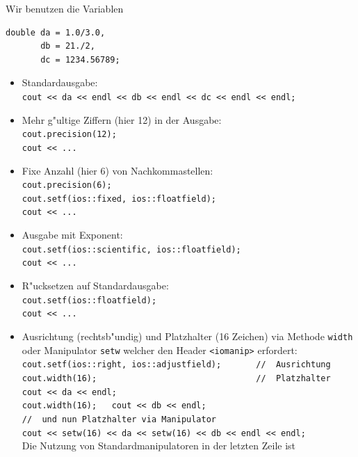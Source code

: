 Wir benutzen die Variablen 
%
\hspace{2cm}
\begin{minipage}[t]{0.4\textwidth}
\begin{verbatim}
double da = 1.0/3.0,
       db = 21./2,
       dc = 1234.56789;
\end{verbatim}
\end{minipage}
%
\begin{itemize}
%
 \item Standardausgabe: \\
 	\verb|cout << da << endl << db << endl << dc << endl << endl;|
%
 \item Mehr g"ultige Ziffern (hier 12) in der Ausgabe:\\
 	\verb|cout.precision(12);| \\
	\verb|cout << ...|
%
 \item Fixe Anzahl (hier 6) von Nachkommastellen: \\
 	\verb|cout.precision(6);|  \\
 	\verb|cout.setf(ios::fixed, ios::floatfield);|  \\
	\verb|cout << ...|
%
 \item Ausgabe mit Exponent:\\
 	\verb|cout.setf(ios::scientific, ios::floatfield);|  \\
	\verb|cout << ...|
%
 \item R"ucksetzen auf Standardausgabe:\\
 	\verb|cout.setf(ios::floatfield);|  \\
	\verb|cout << ...|
%
 \item Ausrichtung (rechtsb"undig) und Platzhalter (16 Zeichen) via Methode \texttt{width}
       oder Manipulator \texttt{setw} welcher den Header
       \verb|<iomanip>| erfordert:\\
 	\verb|cout.setf(ios::right, ios::adjustfield);       //  Ausrichtung| \\
 	\verb|cout.width(16);                                //  Platzhalter|  \\
	\verb|cout << da << endl;| \\
 	\verb|cout.width(16);   cout << db << endl;| \\
      \verb|//  und nun Platzhalter via Manipulator| \\
	\verb|cout << setw(16) << da << setw(16) << db << endl << endl;| \\
	Die Nutzung von Standardmanipulatoren in der letzten Zeile ist

\end{itemize}
